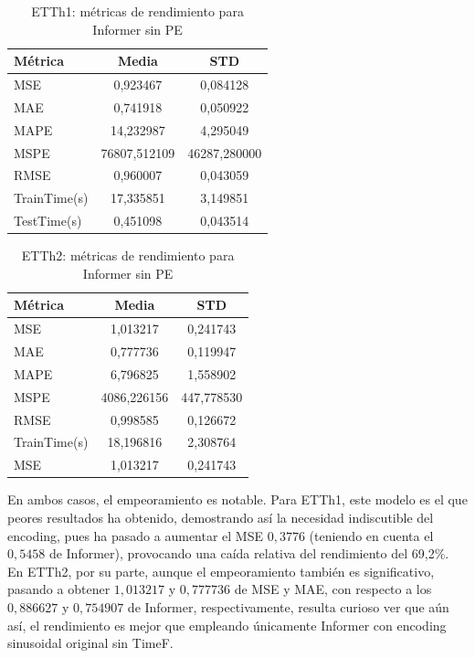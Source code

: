   \begin{table}[!ht]
 	\centering
 	\begin{tabular}{l|c|c}
 		\toprule
 		Métrica & Media & STD \\
 		\midrule
 		MSE & 0,923467 & 0,084128 \\
		MAE & 0,741918 & 0,050922 \\
		MAPE & 14,232987 & 4,295049 \\
		MSPE & 76807,512109 & 46287,280000 \\
		RMSE & 0,960007 & 0,043059 \\
		TrainTime(s) & 17,335851 & 3,149851 \\
		TestTime(s) & 0,451098 & 0,043514 \\
 		\bottomrule
 	\end{tabular}
 	\caption{ETTh1: métricas de rendimiento para Informer sin PE}
 	\label{etth1nope}
 \end{table}
 
 
 
   \begin{table}[!ht]
 	\centering
 	\begin{tabular}{l|c|c}
 		\toprule
 		Métrica & Media & STD \\
 		\midrule
 	 	MSE & 1,013217 & 0,241743 \\
 		MAE & 0,777736 & 0,119947 \\
 		MAPE & 6,796825 & 1,558902 \\
 		MSPE & 4086,226156 & 447,778530 \\
 		RMSE & 0,998585 & 0,126672 \\
 		TrainTime(s) & 18,196816 & 2,308764 \\
 	 	MSE & 1,013217 & 0,241743 \\
 		\bottomrule
 	\end{tabular}
 	\caption{ETTh2: métricas de rendimiento para Informer sin PE}
 	\label{etth2nope}
 \end{table}

En ambos casos, el empeoramiento es notable. Para ETTh1, este modelo es el que peores resultados ha obtenido, demostrando así la necesidad indiscutible del encoding, pues ha pasado a aumentar el MSE $0,3776$ (teniendo en cuenta el $0,5458$ de Informer), provocando una caída relativa del rendimiento del 69,2\%.\\

En ETTh2, por su parte, aunque el empeoramiento también es significativo, pasando a obtener $1,013217$ y $0,777736$ de MSE  y MAE, con respecto a los $0,886627$ y $0,754907$ de Informer, respectivamente, resulta curioso ver que aún así, el rendimiento es mejor que empleando únicamente Informer con encoding sinusoidal original sin TimeF. 

